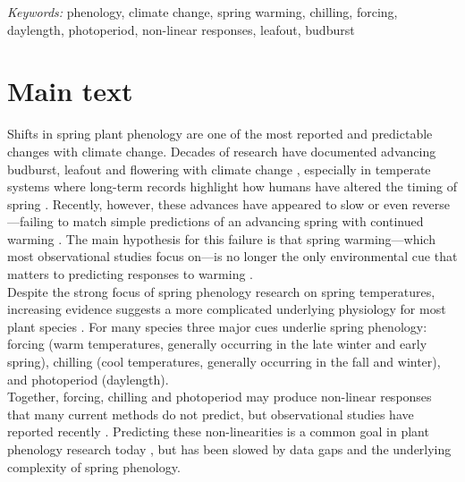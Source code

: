 \documentclass[11pt,letter]{article}
\begin{document}
\noindent \emph{Keywords:} phenology, climate change, spring warming, chilling, forcing, daylength, photoperiod, non-linear responses, leafout, budburst\\

\newpage
\section{Main text} %
Shifts in spring plant phenology are one of the most reported and predictable changes with climate change. Decades of research have documented advancing budburst, leafout and flowering with climate change \citep{delpierre2009, yu2010,Ellwood2012,jochner2013,hereford2017}, especially in temperate systems where long-term records highlight how humans have altered the timing of spring \citep{Schwartz:1997nn,Menzel2003a,menzel2006}. Recently, however, these advances have appeared to slow \citep{fu2015} or even reverse \citep{yu2010}---failing to match simple predictions of an advancing spring with continued warming \citep{Ellwood2012}. The main hypothesis for this failure is that spring warming---which most observational studies focus on---is no longer the only environmental cue that matters to predicting responses to warming \citep{chuine2016,gauzere2019}.\\

Despite the strong focus of spring phenology research on spring temperatures, increasing evidence suggests a more complicated underlying physiology for most plant species \citep[e.g.,][]{zohner2016,gauzere2019,ettinger2020}. For many species three major cues underlie spring phenology: forcing (warm temperatures, generally occurring in the late winter and early spring), chilling (cool temperatures, generally occurring in the fall and winter), and photoperiod (daylength). \\

Together, forcing, chilling and photoperiod may produce non-linear responses that many current methods do not predict, but observational studies have reported recently \citep{fu2015}. Predicting these non-linearities is a common goal in plant phenology research today \citep{gusewell2017,martlusch2017,gauzere2019,chen2019,keenan2019}, but has been slowed by data gaps and the underlying complexity of spring phenology. \\
\end{document}

